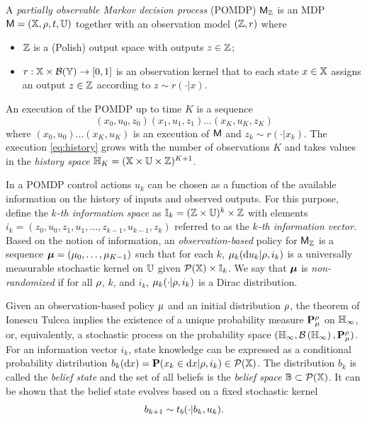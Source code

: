 \documentclass{ifacconf}
\begin{document}
\begin{definition}
\label{def:POMDP}

A \emph{partially observable Markov decision process} (POMDP) $\mathsf{M}_{{\mathbb{Z}}}$ is an MDP $\mathsf{M} = ({\mathbb{X}}, \rho, t, {\mathbb{U}})$ together with an observation model $({\mathbb{Z}}, r)$ where
\begin{itemize}
	\item ${\mathbb{Z}}$ is a (Polish) output space with outputs $z \in {\mathbb{Z}}$;
  \item $r : {\mathbb{X}} \times \mathcal B({\mathbb{Y}}) \rightarrow [0,1]$ is an observation kernel that to each state $x \in {\mathbb{X}}$ assigns an output $z \in {\mathbb{Z}}$ according to $z\sim r(\cdot|x)$.
\end{itemize}
\end{definition}

An execution of the POMDP up to time $K$ is a sequence
\begin{equation}
\label{eq:history}
  (x_0,u_0,z_0) (x_1,u_1,z_1) \ldots (x_K,u_K,z_K)
\end{equation}
where $(x_0, u_0) \ldots (x_K, u_K)$ is an execution of $\mathsf{M}$ and $z_k \sim r(\cdot | x_k)$. The execution \eqref{eq:history} grows with the number of observations $K$ and takes values in the \emph{history space} ${\mathbb{H}}_K = ({\mathbb{X}} \times {\mathbb{U}} \times {\mathbb{Z}})^{K+1}$.

In a POMDP control actions $u_k$ can be chosen as a function of the available information on the history of inputs and observed outputs. For this purpose, define the \emph{$k$-th information space} as ${\mathbb{I}}_k = ({\mathbb{Z}} \times {\mathbb{U}})^{k} \times {\mathbb{Z}}$ with elements $i_k = (z_0,u_0,z_1,u_1,\ldots,z_{k-1}, u_{k-1}, z_k)$ referred to as the \emph{$k$-th information vector}. Based on the notion of information, an \emph{observation-based} policy for $\mathsf{M}_{{\mathbb{Z}}}$ is a sequence ${\boldsymbol{\mu}}=({\mu}_0,\ldots,{\mu}_{K-1})$ such that for each $k$, ${\mu}_k( \mathrm{d} u_k|\rho, i_k)$ is a universally measurable stochastic kernel on ${\mathbb{U}}$  given $\mathcal{P}({\mathbb{X}})\times {\mathbb{I}}_k$. We say that ${\boldsymbol{\mu}}$ is \emph{non-randomized} if for all $\rho$, $k$, and $i_k$, ${\mu}_k(\cdot|\rho, i_k)$ is a Dirac distribution. %

Given an observation-based policy ${\mu}$ and an initial distribution $\rho$, the theorem of Ionescu Tulcea \citep{hll1996} implies the existence of a unique probability measure $\mathbf{P}_{\mu}^\rho$ on ${\mathbb{H}}_\infty$, or, equivalently, a stochastic process on the probability space $({\mathbb{H}}_\infty, \mathcal{B}\left({\mathbb{H}}_\infty\right), \mathbf{P}_{\mu}^\rho)$. For an information vector $i_k$, state knowledge can be expressed as a conditional probability distribution $b_k( \mathrm{d} x )=\mathbf{P}(x_k\in \mathrm{d} x |\rho,i_k)\in \mathcal P ({\mathbb{X}})$. The distribution $b_k$ is called the \emph{belief state} and the set of all beliefs is the \emph{belief space} $\mathbb{B}\subset \mathcal P({\mathbb{X}})$. It can be shown that the belief state evolves based on a fixed stochastic kernel
\begin{align}
\label{eq:trb}
	 b_{k+1} \sim t_b(\cdot|b_k,u_k).
\end{align}
\end{document}
